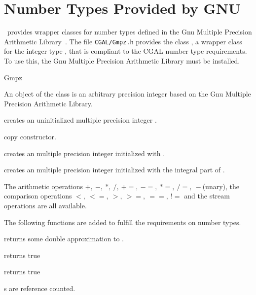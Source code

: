 \section{Number Types Provided by GNU}

\cgal\ provides wrapper classes for number types defined in the 
{\sc Gnu} Multiple Precision Arithmetic Library~\cite{g-gmpal-96}.
The file {\tt  CGAL/Gmpz.h} provides the class , 
a wrapper class for the integer type , that is compliant to the 
CGAL number type requirements.
To use this, the {\sc Gnu} Multiple Precision Arithmetic Library must be 
installed.

\begin{ccClass} {Gmpz}
\label{Gmpz}

\ccDefinition

An object of the class  is an arbitrary precision integer 
based on the {\sc Gnu} Multiple Precision Arithmetic Library. 


\ccCreation
{}

             {creates an uninitialized multiple precision integer \ccVar.}

\ccHidden {}
 	    {copy constructor.}

            {creates an multiple precision integer initialized with
             .}

            {creates an multiple precision integer initialized with
             the integral part of .}

\ccOperations

The arithmetic operations $+,\ -,\ *,\ /,\ +=,\ -=,\ *=,\ /=,\ -$(unary),
the comparison operations $<,\ <=,\ >,\  >=,\ ==,\ !=$ and the stream 
operations are all available.


The following functions are added to fulfill the {\cgal} requirements
on number types.

       {returns some double approximation to .}

       {returns true}

       {returns true}

       {}

\ccImplementation
{}s are reference counted.
\end{ccClass} 

